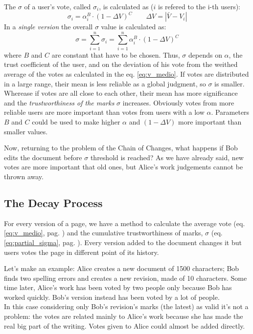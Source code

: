 \documentclass[a4paper,11pt]{article}
\newcommand{\sg}{$\sigma$ }
\newcommand{\al}{$\alpha$ }
\begin{document}
The \sg of a user's vote, called $\sigma_i$, is calculated as ($i$ is refered to the i-th users):
\begin{equation} \label{eq:single_sigma}
\sigma_i = \alpha_i^B \cdot \left(1- \Delta V\right)^C \qquad \Delta V = |\bar{V}- V_i| 
\end{equation}
In a \emph{single version} the overall \sg value is calculated as:
\begin{equation} \label{eq:partial_sigma}
\sigma= \sum_{i=1}^n \sigma_i = \sum_{i=1}^n \alpha_i^B \cdot \left(1- \Delta V\right)^C
\end{equation}
where $B$ and $C$ are constant that have to be chosen.
Thus, \sg depends on $\alpha$, the trust coefficient of the user, and on the deviation of 
his vote from the weithed average of the votes as calculated in the eq. \ref{eq:v_medio}. 
If votes are distributed in a large range, their mean is less reliable as a global judgment, so \sg is smaller. Wherease if votes are all close to each other, their mean has more significance and the \emph{trustworthiness of the marks} \sg increases. Obviously 
votes from more reliable users are more important than votes from users with a low $\alpha$. 
Parameters $B$ and $C$ could be used to make higher \al and $(1-\Delta V)$ more 
important than smaller values.

Now, returning to the problem of the Chain of Changes, what happens if Bob edits the document before $\sigma$ threshold is reached? As we have already said, new votes are more important that old ones, but Alice's work judgements cannot be thrown away.

\subsection{The Decay Process} \label{sec:decay}
For every version of a page, we 
have a method to calculate the average vote (eq. \ref{eq:v_medio}, pag. 
\pageref{eq:v_medio}) and the cumulative trustworthiness of marks, \sg (eq. 
\ref{eq:partial_sigma}, pag. \pageref{eq:partial_sigma}). Every version added to the document changes it but users votes the page in different point of its history.

Let's make an example: Alice creates a new document of 1500 characters; Bob finds two spelling errors and creates a new revision, made of 10 characters. Some time later, 
Alice's work has been voted by two people only because Bob has worked quickly. Bob's version instead has been voted by a lot of people. \\ In this case considering only Bob's revision's marks (the latest) as valid it's not a problem: the votes are related mainly to Alice's work because she has made the real big part of the writing.  Votes given to Alice could almost be added directly.
\end{document}

